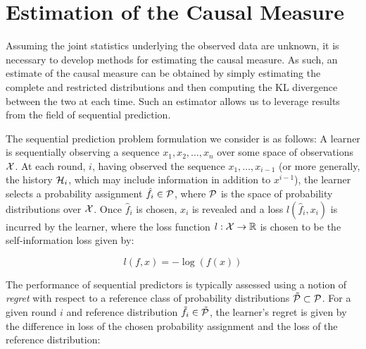 \section{Estimation of the Causal Measure} \label{estimation}

\begin{comment}
- Sequential Prediction
- Notion of causality regret - whereas DI has one value that the Tsachy paper tries to converge to, we are looking more at a sequential prediction problem because we want to estimate causality accurately at every point in time
- Theorem
- Independent selection of restricted and complete reference classes - addresses problem with restricted distribution being infinite order raised in Purdon paper
- Discussion of estimating with time varying statistics
- Can be computed online
\end{comment}

Assuming the joint statistics underlying the observed data are unknown, it is necessary to develop methods for estimating the causal measure. As such, an estimate of the causal measure can be obtained by simply estimating the complete and restricted distributions and then computing the KL divergence between the two at each time. Such an estimator allows us to leverage results from the field of sequential prediction.

The sequential prediction problem formulation we consider is as follows: A learner is sequentially observing a sequence $x_1,x_2,\dots,x_n$ over some space of observations $\mathcal{X}$. At each round, $i$, having observed the sequence $x_1,\dots,x_{i-1}$ (or more generally, the history $\mathcal{H}_i$, which may include information in addition to $x^{i-1}$), the learner selects a probability assignment $\hat{f}_i \in \mathcal{P}$, where $\mathcal{P}$ is the space of probability distributions over $\mathcal{X}$. Once $\hat{f}_i$ is chosen, $x_i$ is revealed and a loss $l(\hat{f}_i,x_i)$ is incurred by the learner, where the loss function $l:\mathcal{X}\rightarrow \mathbb{R}$ is chosen to be the self-information loss given by:

\begin{equation}
l(f,x) = -\log(f(x))
\end{equation}

The performance of sequential predictors is typically assessed using a notion of \emph{regret} with respect to a reference class of probability distributions $\tilde{\mathcal{P}} \subset \mathcal{P}$. For a given round $i$ and reference distribution $\tilde{f}_i \in \tilde{\mathcal{P}}$, the learner's regret is given by the difference in loss of the chosen probability assignment and the loss of the reference distribution:

